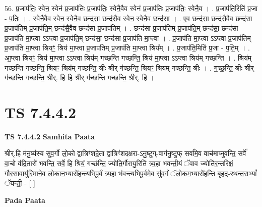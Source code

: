 \documentclass[17pt]{extarticle}
\begin{document}
56. प्र॒जाप॑तिः॒ स्वेन॒ स्वेन॑ प्र॒जाप॑तिः प्र॒जाप॑तिः॒ स्वेनै॒वैव स्वेन॑ प्र॒जाप॑तिः प्र॒जाप॑तिः॒ स्वेनै॒व । . प्र॒जाप॑ति॒रिति॑ प्र॒जा - प॒तिः॒ । . स्वेनै॒वैव स्वेन॒ स्वेनै॒व छन्द॑सा॒ छन्द॑सै॒व स्वेन॒ स्वेनै॒व छन्द॑सा । . ए॒व छन्द॑सा॒ छन्द॑सै॒वैव छन्द॑सा प्र॒जाप॑तिम् प्र॒जाप॑ति॒म् छन्द॑सै॒वैव छन्द॑सा प्र॒जाप॑तिम् । . छन्द॑सा प्र॒जाप॑तिम् प्र॒जाप॑ति॒म् छन्द॑सा॒ छन्द॑सा प्र॒जाप॑ति मा॒प्त्वा ऽऽप्त्वा प्र॒जाप॑ति॒म् छन्द॑सा॒ छन्द॑सा प्र॒जाप॑ति मा॒प्त्वा । . प्र॒जाप॑ति मा॒प्त्वा ऽऽप्त्वा प्र॒जाप॑तिम् प्र॒जाप॑ति मा॒प्त्वा श्रियꣳ॒॒ श्रिय॑ मा॒प्त्वा प्र॒जाप॑तिम् प्र॒जाप॑ति मा॒प्त्वा श्रिय᳚म् । . प्र॒जाप॑ति॒मिति॑ प्र॒जा - प॒ति॒म् । . आ॒प्त्वा श्रियꣳ॒॒ श्रिय॑ मा॒प्त्वा ऽऽप्त्वा श्रिय॑म् गच्छन्ति गच्छन्ति॒ श्रिय॑ मा॒प्त्वा ऽऽप्त्वा श्रिय॑म् गच्छन्ति । . श्रिय॑म् गच्छन्ति गच्छन्ति॒ श्रियꣳ॒॒ श्रिय॑म् गच्छन्ति॒ श्रीः श्रीर् ग॑च्छन्ति॒ श्रियꣳ॒॒ श्रिय॑म् गच्छन्ति॒ श्रीः । . ग॒च्छ॒न्ति॒ श्रीः श्रीर् ग॑च्छन्ति गच्छन्ति॒ श्रीर्. हि हि श्रीर् ग॑च्छन्ति गच्छन्ति॒ श्रीर्. हि । \newline
\pagebreak
{}

\section{ TS 7.4.4.2 }

\textbf{TS 7.4.4.2 } \newline
\textbf{Samhita Paata} \newline

श्रीर्.हि म॑नु॒ष्य॑स्य सुव॒र्गो लो॒को द्वात्रिꣳ॑शदे॒ता द्वात्रिꣳ॑शदक्षरा-ऽनु॒ष्टुग्-वाग॑नु॒ष्टुफ् सर्वा॑मे॒व वाच॑माप्नुवन्ति॒ सर्वे॑ वा॒चो व॑दि॒तारो॑ भवन्ति॒ सर्वे॒ हि श्रियं॒ गच्छ॑न्ति॒ ज्योति॒र्गौरायु॒रिति॑ त्र्य॒हा भ॑वन्ती॒यं ॅवाव ज्योति॑र॒न्तरि॑क्षं॒ गौर॒सावायु॑रि॒माने॒व लो॒कान॒भ्यारो॑हन्त्यभिपू॒र्वं त्र्य॒हा भ॑वन्त्यभिपू॒र्वमे॒व सु॑व॒र्गं ॅलो॒कम॒भ्यारो॑हन्ति बृहद्-रथन्त॒राभ्यां᳚ ॅयन्ती॒ - [  ] \newline

\textbf{Pada Paata} \newline
\end{document}
